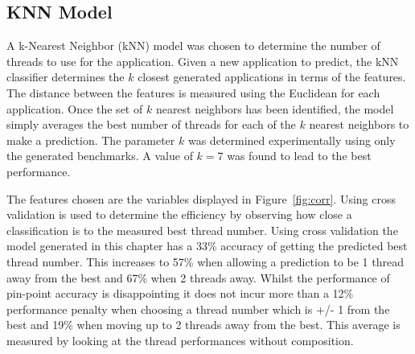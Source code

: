 \subsection{KNN Model}

A k-Nearest Neighbor (kNN) model was chosen to determine the number of threads to use for the application.
Given a new application to predict, the kNN classifier determines the $k$ closest generated applications in terms of the features.
The distance between the features is measured using the Euclidean for each application.
Once the set of $k$ nearest neighbors has been identified, the model simply averages the best number of threads for each of the $k$ nearest neighbors to make a prediction.
The parameter $k$ was determined experimentally using only the generated benchmarks.
A value of $k=7$ was found to lead to the best performance.

The features chosen are the variables displayed in Figure~\ref{fig:corr}.
Using cross validation is used to determine the efficiency by observing how close a classification is to the measured best thread number.
Using cross validation the model generated in this chapter has a 33\% accuracy of getting the predicted best thread number.
This increases to 57\% when allowing a prediction to be 1 thread away from the best and 67\% when 2 threads away.
Whilst the performance of pin-point accuracy is disappointing it does not incur more than a 12\% performance penalty when choosing a thread number which is +/- 1 from the best and 19\% when moving up to 2 threads away from the best.
This average is measured by looking at the thread performances without composition.
